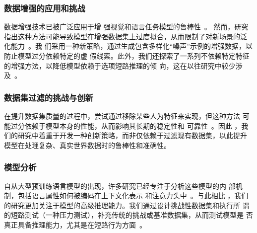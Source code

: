 \subsubsection*{数据增强的应用和挑战}
数据增强技术已被广泛应用于增
强视觉和语言任务模型的鲁棒性~\cite{perez2017effectiveness,belinkov2017synthetic}。
然而，研究指出这种方法可能导致模型在增强数据集上过度拟合，从而限制了对新场景的泛
化能力~\cite{jia2017adversarial,ribeiro2018semantically,iyyer2018adversarial,liu2019inoculation,mccoy2019right}。我
们采用一种新策略，通过生成包含多样化``噪声''示例的增强数据，以防止模型过分依赖特定的虚
假线索。此外，我们还探索了一系列不依赖特定特征的增强方法，以降低模型依赖于选项短路推理的倾
向，这在以往研究中较少涉及~\cite{xie2020unsupervised,sennrich2016improving,cubuk2018autoaugment,cubuk2020randaugment,zhang2017mixup,feng2021survey}。

\subsubsection*{数据集过滤的挑战与创新}
在提升数据集质量的过程中，尝试通过移除某些人为特征来实现，但这种方法
可能过分依赖于模型本身的性能，从而影响其长期的稳定性和
可靠性~\cite{yaghoobzadeh2019robust, bras2020adversarial}。因此
，我们的研究中着重于开发一种创新策略，而非仅依赖于过滤现有数据集，以此提升
模型在处理复杂、真实世界数据时的鲁棒性和准确性。

\subsubsection*{模型分析}
自从大型预训练语言模型的出现，许多研究已经专注于分析这些模型的内
部机制，包括语言属性如何被编码在上下文化表示
和注意力头中~\cite{goldberg2019assessing,clark2019does,liu2019linguistic,tenney2019you}。与此相比
，我们的研究更加关注于模型的高级推理能力。我们通过设计挑战性数据集和执行所
谓的短路测试（一种压力测试），补充传统的挑战或基准数据集，从而测试模型是
否真正具备推理能力，尤其是在短路行为方面~\cite{belinkov2019analysis}。




